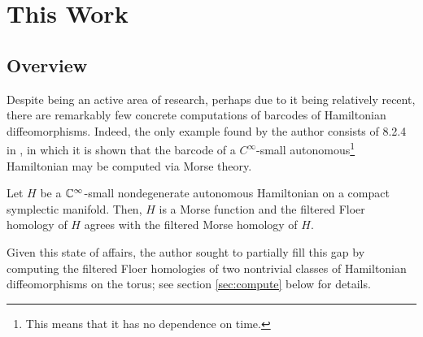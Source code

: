 \section{This Work}

\subsection{Overview}

Despite being an active area of research, perhaps due to it being relatively recent, there are remarkably few concrete computations of barcodes of Hamiltonian diffeomorphisms. Indeed, the only example found by the author consists of 8.2.4 in \cite{polterovich}, in which it is shown that the barcode of a $C^\infty$-small autonomous\footnote{This means that it has no dependence on time.} Hamiltonian may be computed via Morse theory.

\begin{prop}
Let $H$ be a $\mathbb{C}^\infty$-small nondegenerate autonomous Hamiltonian on a compact symplectic manifold. Then, $H$ is a Morse function and the filtered Floer homology of $H$ agrees with the filtered Morse homology of $H$.
\end{prop}

Given this state of affairs, the author sought to partially fill this gap by computing the filtered Floer homologies of two nontrivial classes of Hamiltonian diffeomorphisms on the torus; see section \ref{sec:compute} below for details.

